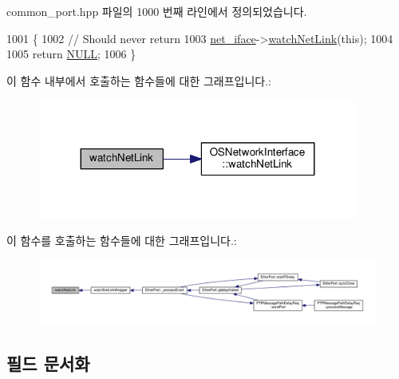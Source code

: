 common\+\_\+port.\+hpp 파일의 1000 번째 라인에서 정의되었습니다.


\begin{DoxyCode}
1001     \{
1002         \textcolor{comment}{// Should never return}
1003         \hyperlink{class_common_port_a7bc95d8cb3e95a8e7f9c5dc261289e37}{net\_iface}->\hyperlink{class_o_s_network_interface_afc43662e3774645bd8443dc68e5e6ea2}{watchNetLink}(\textcolor{keyword}{this});
1004 
1005         \textcolor{keywordflow}{return} \hyperlink{openavb__types__base__pub_8h_a070d2ce7b6bb7e5c05602aa8c308d0c4}{NULL};
1006     \}
\end{DoxyCode}


이 함수 내부에서 호출하는 함수들에 대한 그래프입니다.\+:
\nopagebreak
\begin{figure}[H]
\begin{center}
\leavevmode
\includegraphics[width=299pt]{class_common_port_a7fc2ad2925376becd473fcfc684472fb_cgraph}
\end{center}
\end{figure}




이 함수를 호출하는 함수들에 대한 그래프입니다.\+:
\nopagebreak
\begin{figure}[H]
\begin{center}
\leavevmode
\includegraphics[width=350pt]{class_common_port_a7fc2ad2925376becd473fcfc684472fb_icgraph}
\end{center}
\end{figure}




\subsection{필드 문서화}
